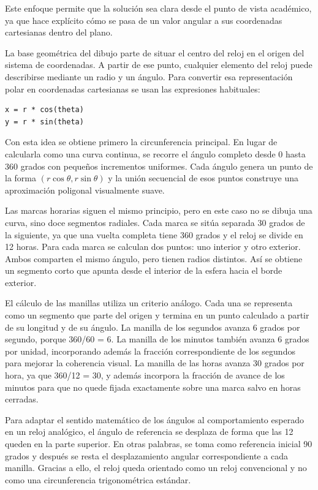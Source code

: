 \documentclass[12pt,a4paper]{article}
\begin{document}
Este enfoque permite que la solución sea clara desde el punto de vista académico, ya que hace explícito cómo se pasa de un valor angular a sus coordenadas cartesianas dentro del plano.

La base geométrica del dibujo parte de situar el centro del reloj en el origen del sistema de coordenadas. A partir de ese punto, cualquier elemento del reloj puede describirse mediante un radio y un ángulo. Para convertir esa representación polar en coordenadas cartesianas se usan las expresiones habituales:

\begin{verbatim}
x = r * cos(theta)
y = r * sin(theta)
\end{verbatim}

Con esta idea se obtiene primero la circunferencia principal. En lugar de calcularla como una curva continua, se recorre el ángulo completo desde 0 hasta 360 grados con pequeños incrementos uniformes. Cada ángulo genera un punto de la forma $(r \cos \theta, r \sin \theta)$ y la unión secuencial de esos puntos construye una aproximación poligonal visualmente suave.

Las marcas horarias siguen el mismo principio, pero en este caso no se dibuja una curva, sino doce segmentos radiales. Cada marca se sitúa separada 30 grados de la siguiente, ya que una vuelta completa tiene 360 grados y el reloj se divide en 12 horas. Para cada marca se calculan dos puntos: uno interior y otro exterior. Ambos comparten el mismo ángulo, pero tienen radios distintos. Así se obtiene un segmento corto que apunta desde el interior de la esfera hacia el borde exterior.

El cálculo de las manillas utiliza un criterio análogo. Cada una se representa como un segmento que parte del origen y termina en un punto calculado a partir de su longitud y de su ángulo. La manilla de los segundos avanza 6 grados por segundo, porque 360/60 = 6. La manilla de los minutos también avanza 6 grados por unidad, incorporando además la fracción correspondiente de los segundos para mejorar la coherencia visual. La manilla de las horas avanza 30 grados por hora, ya que 360/12 = 30, y además incorpora la fracción de avance de los minutos para que no quede fijada exactamente sobre una marca salvo en horas cerradas.

Para adaptar el sentido matemático de los ángulos al comportamiento esperado en un reloj analógico, el ángulo de referencia se desplaza de forma que las 12 queden en la parte superior. En otras palabras, se toma como referencia inicial 90 grados y después se resta el desplazamiento angular correspondiente a cada manilla. Gracias a ello, el reloj queda orientado como un reloj convencional y no como una circunferencia trigonométrica estándar.
\end{document}
